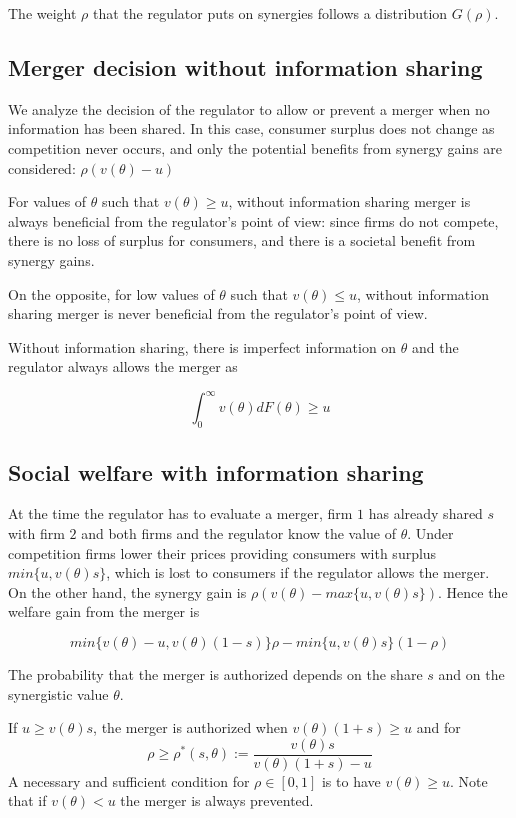 \documentclass[a4paper,leqno]{article}%
\renewcommand{\t}{\theta}
\begin{document}
The weight $\rho$ that the regulator puts on synergies follows a distribution $G(\rho)$.


\subsection{Merger decision without information sharing}

We analyze the decision of the regulator to allow or prevent a merger when no information has been shared. In this case, consumer surplus does not change as competition never occurs, and only the potential benefits from synergy gains are considered: $\rho (v(\t)-u)$

For values of $\t$ such that $v(\t)\geq u$, without information sharing merger is always beneficial from the regulator's point of view: since firms do not compete, there is no loss of surplus for consumers, and there is a societal benefit from synergy gains.

On the opposite, for low values of $\t$ such that $v(\t)\leq u$, without information sharing merger is never beneficial from the regulator's point of view.

Without information sharing, there is imperfect information on $\t$ and the regulator always allows the merger as 

\[
\int_{0}^{\infty}v(\t)dF(\t)\geq u
\]

\medskip

\subsection{Social welfare with information sharing}

\medskip

At the time the regulator has to evaluate a merger, firm $1$ has already shared $s$ with firm $2$ and both firms and the regulator know the value of $\t$. Under competition firms lower their prices providing consumers with surplus $min\{u,v(\t)s\}$, which is lost to consumers if the regulator allows the merger. On the other hand, the synergy gain is $\rho (v(\t)-max\{u,v(\t)s\})$. Hence the welfare gain from the merger is

\[
min\{v(\t)-u,v(\t)(1-s)\}\rho-min\{u,v(\t)s\}(1-\rho)
\]




The probability that the merger is authorized depends on the share $s$ and on the synergistic value $\t$. 

If $u\geq v(\t)s$, the merger is authorized when $v(\t)(1+s)\geq u$ and for 
    \begin{equation}
           \rho\geq \rho^*(s,\t):=\frac{v(\t)s}{v(\t)(1+s)-u}
    \end{equation}
A necessary and sufficient condition for $\rho\in[0,1]$ is to have $v(\t)\geq u$. Note that if $v(\t)<u$ the merger is always prevented.
\end{document}
